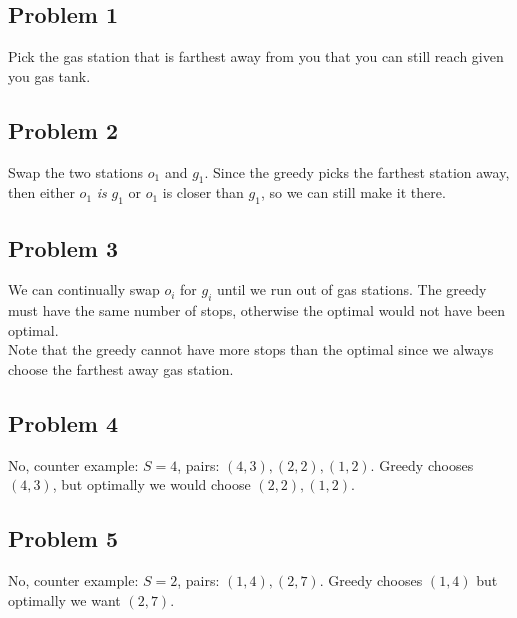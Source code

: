 \documentclass{article}
\begin{document}
\subsection*{Problem 1}
Pick the gas station that is farthest away from you that you can still reach given you gas tank.

\subsection*{Problem 2}
Swap the two stations $o_1$ and $g_1$. Since the greedy picks the farthest station away, then either $o_1$ \textit{is} $g_1$ or $o_1$ is closer than $g_1$, so we can still make it there. 

\subsection*{Problem 3}
We can continually swap $o_i$ for $g_i$ until we run out of gas stations. The greedy must have the same number of stops, otherwise the optimal would not have been optimal.\\

\noindent Note that the greedy cannot have more stops than the optimal since we always choose the farthest away gas station.

\subsection*{Problem 4}
No, counter example: $S = 4$, pairs: $(4,3), (2,2), (1,2)$. Greedy chooses $(4,3)$, but optimally we would choose $(2,2), (1,2)$.

\subsection*{Problem 5}
No, counter example: $S = 2$, pairs: $(1,4), (2,7)$. Greedy chooses $(1,4)$ but optimally we want $(2,7)$.
\end{document}
